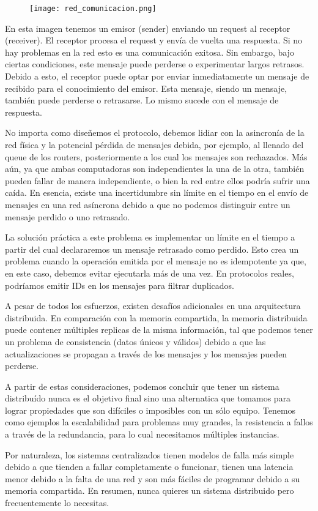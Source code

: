 \documentclass[12pt]{article}
\begin{document}
\begin{figure}[h]
   \centering
   \texttt{[image: red\_comunicacion.png]}
\end{figure}

En esta imagen tenemos un emisor (sender) enviando un request al receptor (receiver).
El receptor procesa el request y envía de vuelta una respuesta. 
Si no hay problemas en la red esto es una comunicación exitosa.
Sin embargo, bajo ciertas condiciones, 
este mensaje puede perderse o experimentar largos retrasos.
Debido a esto,
el receptor puede optar por enviar inmediatamente un mensaje de recibido para el conocimiento del emisor.
Esta mensaje, siendo un mensaje, también puede perderse o retrasarse.
Lo mismo sucede con el mensaje de respuesta.

No importa como diseñemos el protocolo, debemos lidiar con la asincronía de la red física y la potencial pérdida de mensajes debida,
por ejemplo,
al llenado del queue de los routers,
posteriormente a los cual los mensajes son rechazados.
Más aún, 
ya que ambas computadoras son independientes la una de la otra,
también pueden fallar de manera independiente, 
o bien la red entre ellos podría sufrir una caída.
En esencia, 
existe una incertidumbre sin límite en el tiempo en el envío de mensajes en una red asíncrona debido a que no podemos distinguir entre un mensaje perdido o uno retrasado.

La solución práctica a este problema es implementar un límite en el tiempo a partir del cual declararemos un mensaje retrasado como perdido.
Esto crea un problema cuando la operación emitida por el mensaje no es idempotente  ya que, en este caso, debemos evitar ejecutarla más de una vez.
En protocolos reales, 
podríamos emitir IDs en los mensajes para filtrar duplicados.

A pesar de todos los esfuerzos,
existen desafíos adicionales en una arquitectura distribuida.
En comparación con la memoria compartida,
la memoria distribuida puede contener múltiples replicas de la misma información,
tal que podemos tener un problema de consistencia 
(datos únicos y válidos)
debido a que las actualizaciones se propagan a través de los mensajes y los mensajes pueden perderse.

A partir de estas consideraciones, 
podemos concluir que tener un sistema distribuído nunca es el objetivo final sino una alternatica que tomamos para lograr propiedades que son difíciles o imposibles con un sólo equipo.
Tenemos como ejemplos la escalabilidad para problemas muy grandes,
la resistencia a fallos a través de la redundancia,
para lo cual necesitamos múltiples instancias.

Por naturaleza, 
los sistemas centralizados tienen modelos de falla más simple debido a que tienden a fallar completamente o funcionar,
tienen una latencia menor debido a la falta de una red y son más fáciles de programar debido a su memoria compartida.
En resumen, nunca quieres un sistema distribuido pero frecuentemente lo necesitas.
\end{document}

